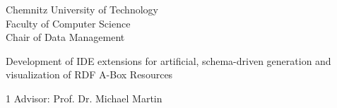 \begin{tuctitlepage}
\begin{tuctitleorgunit}
Chemnitz University of Technology \\
Faculty of Computer Science \\
Chair of Data Management
\end{tuctitleorgunit}

\tuctitlelogo

\bigskip
{}
\bigskip
{}

\vspace*{0pt plus 2fill}
\begin{tuctitletopic}
    Development of IDE extensions for artificial, schema-driven generation and visualization of RDF A-Box Resources
\end{tuctitletopic}
\vspace*{0pt plus 2fill}

\begin{tuctitletable}[\bfseries]{1}
Advisor:  Prof. Dr. Michael Martin \\
\end{tuctitletable}

\vspace*{0pt plus 1fill}

\end{tuctitlepage}